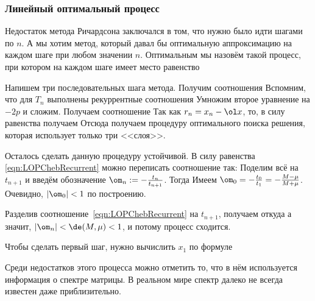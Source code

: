\documentclass[a4paper]{article}
\begin{document}
\subsubsection{Линейный оптимальный процесс}

Недостаток метода Ричардсона заключался в том, что нужно было идти шагами по $n$. А мы хотим
метод, который давал бы оптимальную
аппроксимацию на каждом шаге при любом значении $n$. Оптимальным мы назовём такой
процесс, при котором на каждом шаге имеет место равенство

Напишем три последовательных шага метода. Получим соотношения
Вспомним, что для $T_n$ выполнены рекуррентные соотношения
Умножим второе уравнение  на $-2p$ и сложим.
Получаем соотношение
Так как $r_n = x_n - \ol x$, то, в силу равенства
получаем
Отсюда получаем процедуру оптимального поиска решения,
которая использует только три <<слоя>>.

Осталось сделать данную процедуру устойчивой. В силу равенства
\eqref{eqn:LOPChebRecurrent} можно переписать соотношение так:
Поделим всё на $t_{n+1}$  и введём обозначение $\om_n := -\frac{t_n}{t_{n+1}}$.
Тогда
Имеем $\om_0 = -\frac{t_0}{t_1} = -\frac{M-\mu}{M+\mu}$.
Очевидно, $|\om_0| < 1$ по построению.

Разделив соотношение~\eqref{eqn:LOPChebRecurrent} на $t_{n+1}$, получаем
откуда
а значит, $|\om_n| < \de(M, \mu) < 1$, и потому процесс сходится.

Чтобы сделать первый шаг, нужно вычислить $x_1$ по формуле

Среди недостатков этого процесса можно отметить то, что в нём используется
информация о спектре матрицы. В реальном мире спектр далеко не всегда известен даже приблизительно.
\end{document}
